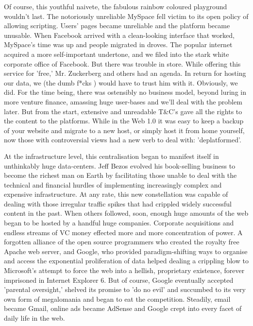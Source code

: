 Of course, this youthful naivete, the fabulous rainbow coloured playground wouldn't last. The notoriously unreliable MySpace fell victim to its open policy of allowing scripting. Users' pages became unreliable and the platform became unusable. When Facebook arrived with a clean-looking interface that worked, MySpace's time was up and people migrated in droves. The popular internet acquired a more self-important undertone, and we filed into the stark white corporate office of Facebook. But there was trouble in store. While offering this service for 'free,' Mr. Zuckerberg and others had an agenda. In return for hosting our data, we (the dumb f*cks \cite{carlson2010ims}) would have to trust him with it. Obviously, we did. For the time being, there was ostensibly no business model, beyond luring in more venture finance, amassing huge user-bases and we'll deal with the problem later. But from the start, extensive and unreadable T\&C's gave all the rights to the content to the platforms. While in the Web 1.0 it was easy to keep a backup of your website and migrate to a new host, or simply host it from home yourself, now those with controversial views had a new verb to deal with: 'deplatformed'.

At the infrastructure level, this centralisation began to manifest itself in unthinkably huge data-centers. Jeff Bezos evolved his book-selling business to become the richest man on Earth by facilitating those unable to deal with the technical and financial hurdles of implementing increasingly complex and expensive infrastructure. At any rate, this new constellation was capable of dealing with those irregular traffic spikes that had crippled widely successful content in the past. When others followed, soon, enough huge amounts of the web began to be hosted by a handful huge companies. Corporate acquisitions and endless streams of VC money effected more and more concentration of power. A forgotten alliance of the open source programmers who created the royalty free Apache web server, and Google, who provided paradigm-shifting ways to organise and access the exponential proliferation of data helped dealing a crippling blow to Microsoft's attempt to force the web into a hellish, proprietary existence, forever imprisoned in Internet Explorer 6. But of course, Google eventually accepted 'parental oversight,' shelved its promise to 'do no evil' and succumbed to its very own form of megalomania and began to eat the competition. Steadily, email became Gmail, online ads became AdSense and Google crept into every facet of daily life in the web.

